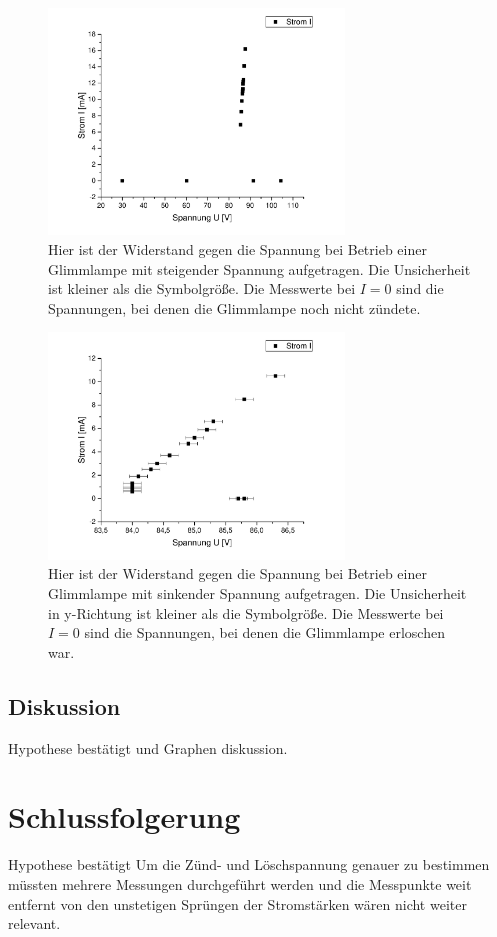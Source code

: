 \documentclass[
	a4paper,
	12pt,
	pagesize,
	ngerman
]{scrartcl}
\begin{document}
	\begin{figure}[H]
		\includegraphics[width=0.7\textwidth]{glimm_steig}
		\centering
		\caption{Hier ist der Widerstand gegen die Spannung bei Betrieb einer Glimmlampe mit steigender Spannung aufgetragen. Die Unsicherheit ist kleiner als die Symbolgröße. Die Messwerte bei $I=0$ sind die Spannungen, bei denen die Glimmlampe noch nicht zündete.}
		\label{glimm_steig}
		\centering
	\end{figure}
\begin{figure}[H]
	\includegraphics[width=0.7\textwidth]{glimm_fall}
	\centering
	\caption{Hier ist der Widerstand gegen die Spannung bei Betrieb einer Glimmlampe mit sinkender Spannung aufgetragen. Die Unsicherheit in y-Richtung ist kleiner als die Symbolgröße. Die Messwerte bei $I=0$ sind die Spannungen, bei denen die Glimmlampe erloschen war.}
	\label{glimm_fall}
	\centering
\end{figure}
	\subsection{Diskussion}
	Hypothese bestätigt und Graphen diskussion.
	
	\section{Schlussfolgerung}
	Hypothese bestätigt
	Um die Zünd- und Löschspannung genauer zu bestimmen müssten mehrere Messungen durchgeführt werden und die Messpunkte weit entfernt von den unstetigen Sprüngen der Stromstärken wären nicht weiter relevant.
	
	\printbibliography
\end{document}
